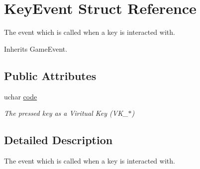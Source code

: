 \hypertarget{struct_key_event}{\section{Key\-Event Struct Reference}
\label{struct_key_event}
}


The event which is called when a key is interacted with.  




Inherits Game\-Event.

\subsection*{Public Attributes}
\begin{DoxyCompactItemize}
\item 
\hypertarget{struct_key_event_abeb8cdddbd4fe39b3cd3f8197612a87a}{uchar \hyperlink{struct_key_event_abeb8cdddbd4fe39b3cd3f8197612a87a}{code}}\label{struct_key_event_abeb8cdddbd4fe39b3cd3f8197612a87a}

\begin{DoxyCompactList}\small\item\em The pressed key as a Viritual Key (V\-K\-\_\-$\ast$) \end{DoxyCompactList}\end{DoxyCompactItemize}


\subsection{Detailed Description}
The event which is called when a key is interacted with. 

